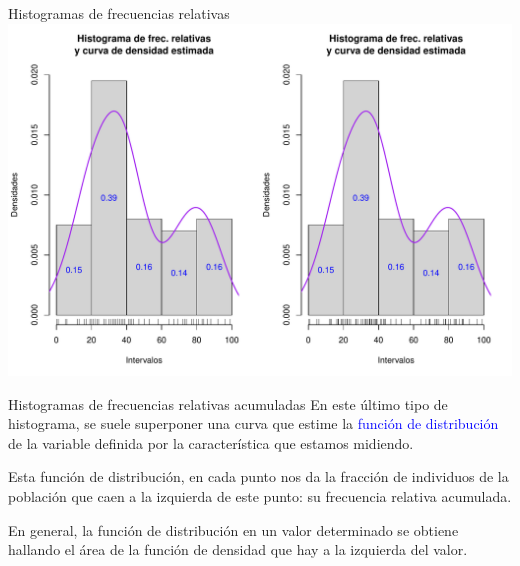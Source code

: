 \documentclass[
  ignorenonframetext,
  aspectratio=169]{beamer}
\newcommand\blue[1]{\textcolor{blue}{#1}}
\begin{document}
\begin{frame}{Histogramas de frecuencias relativas}
\protect\hypertarget{histogramas-de-frecuencias-relativas-2}{}
\includegraphics{Hora6_files/figure-beamer/unnamed-chunk-52-1.pdf}
\end{frame}

\begin{frame}{Histogramas de frecuencias relativas acumuladas}
\protect\hypertarget{histogramas-de-frecuencias-relativas-acumuladas}{}
En este último tipo de histograma, se suele superponer una curva que
estime la \blue{función de distribución} de la variable definida por la
característica que estamos midiendo.

Esta función de distribución, en cada punto nos da la fracción de
individuos de la población que caen a la izquierda de este punto: su
frecuencia relativa acumulada.

En general, la función de distribución en un valor determinado se
obtiene hallando el área de la función de densidad que hay a la
izquierda del valor.
\end{frame}
\end{document}
